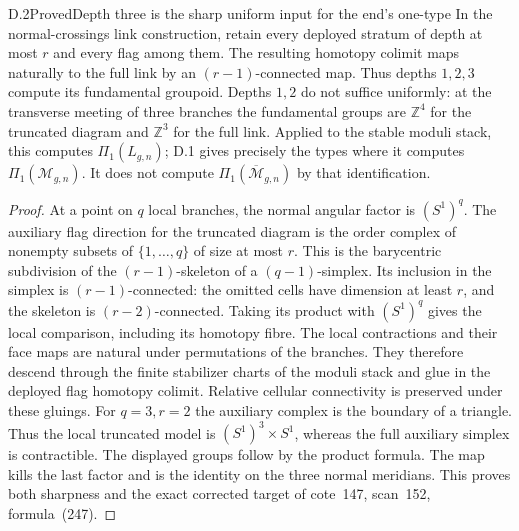 \begin{result}{D.2}{Proved}{Depth three is the sharp uniform input for the end's one-type}
In the normal-crossings link construction, retain every deployed stratum of depth at most $r$ and every flag among them. The resulting homotopy colimit maps naturally to the full link by an $(r-1)$-connected map. Thus depths $1,2,3$ compute its fundamental groupoid. Depths $1,2$ do not suffice uniformly: at the transverse meeting of three branches the fundamental groups are $\mathbb Z^4$ for the truncated diagram and $\mathbb Z^3$ for the full link. Applied to the stable moduli stack, this computes $\Pi_1(L_{g,n})$; D.1 gives precisely the types where it computes $\Pi_1(\mathcal M_{g,n})$. It does not compute $\Pi_1(\overline{\mathcal M}_{g,n})$ by that identification.
\end{result}
\begin{proof}
At a point on $q$ local branches, the normal angular factor is $(S^1)^q$. The auxiliary flag direction for the truncated diagram is the order complex of nonempty subsets of $\{1,\ldots,q\}$ of size at most $r$. This is the barycentric subdivision of the $(r-1)$-skeleton of a $(q-1)$-simplex. Its inclusion in the simplex is $(r-1)$-connected: the omitted cells have dimension at least $r$, and the skeleton is $(r-2)$-connected. Taking its product with $(S^1)^q$ gives the local comparison, including its homotopy fibre. The local contractions and their face maps are natural under permutations of the branches. They therefore descend through the finite stabilizer charts of the moduli stack and glue in the deployed flag homotopy colimit. Relative cellular connectivity is preserved under these gluings. For $q=3,r=2$ the auxiliary complex is the boundary of a triangle. Thus the local truncated model is $(S^1)^3\times S^1$, whereas the full auxiliary simplex is contractible. The displayed groups follow by the product formula. The map kills the last factor and is the identity on the three normal meridians. This proves both sharpness and the exact corrected target of cote~147, scan~152, formula~(247).
\end{proof}

